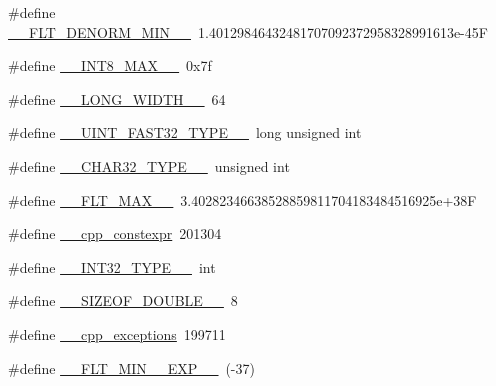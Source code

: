 \begin{DoxyCompactItemize}
\item 
\#define \hyperlink{cmake-build-debug_2babel__client__autogen_2moc__predefs_8h_a20b8951342fd8b8af91e2bc9b34eb929}{\+\_\+\+\_\+\+F\+L\+T\+\_\+\+D\+E\+N\+O\+R\+M\+\_\+\+M\+I\+N\+\_\+\+\_\+}~1.\+40129846432481707092372958328991613e-\/45F
\item 
\#define \hyperlink{cmake-build-debug_2babel__client__autogen_2moc__predefs_8h_a326c37ba86474b37dd0ae9100e005fac}{\+\_\+\+\_\+\+I\+N\+T8\+\_\+\+M\+A\+X\+\_\+\+\_\+}~0x7f
\item 
\#define \hyperlink{cmake-build-debug_2babel__client__autogen_2moc__predefs_8h_a136189a915ba49e719dcffbeba8412fd}{\+\_\+\+\_\+\+L\+O\+N\+G\+\_\+\+W\+I\+D\+T\+H\+\_\+\+\_\+}~64
\item 
\#define \hyperlink{cmake-build-debug_2babel__client__autogen_2moc__predefs_8h_a0746bdc61f4500f26c2b7408814ebfcf}{\+\_\+\+\_\+\+U\+I\+N\+T\+\_\+\+F\+A\+S\+T32\+\_\+\+T\+Y\+P\+E\+\_\+\+\_\+}~long unsigned int
\item 
\#define \hyperlink{cmake-build-debug_2babel__client__autogen_2moc__predefs_8h_acd1e46c682808f15749b16266ade0c27}{\+\_\+\+\_\+\+C\+H\+A\+R32\+\_\+\+T\+Y\+P\+E\+\_\+\+\_\+}~unsigned int
\item 
\#define \hyperlink{cmake-build-debug_2babel__client__autogen_2moc__predefs_8h_aa26975016847959a13829cb568b126b3}{\+\_\+\+\_\+\+F\+L\+T\+\_\+\+M\+A\+X\+\_\+\+\_\+}~3.\+40282346638528859811704183484516925e+38F
\item 
\#define \hyperlink{cmake-build-debug_2babel__client__autogen_2moc__predefs_8h_ae12b3591c41f3b52c31cd8b16773d5ae}{\+\_\+\+\_\+cpp\+\_\+constexpr}~201304
\item 
\#define \hyperlink{cmake-build-debug_2babel__client__autogen_2moc__predefs_8h_a72f76585ea7d1131d4e9be0110fb0ec3}{\+\_\+\+\_\+\+I\+N\+T32\+\_\+\+T\+Y\+P\+E\+\_\+\+\_\+}~int
\item 
\#define \hyperlink{cmake-build-debug_2babel__client__autogen_2moc__predefs_8h_a6a0b73b50b59fa18dbcea5b6dee0899f}{\+\_\+\+\_\+\+S\+I\+Z\+E\+O\+F\+\_\+\+D\+O\+U\+B\+L\+E\+\_\+\+\_\+}~8
\item 
\#define \hyperlink{cmake-build-debug_2babel__client__autogen_2moc__predefs_8h_a42bcb9278fa2b4721fe04fc0627055ce}{\+\_\+\+\_\+cpp\+\_\+exceptions}~199711
\item 
\#define \hyperlink{cmake-build-debug_2babel__client__autogen_2moc__predefs_8h_a442f6e00169e1726f7b9a05eb3c617d8}{\+\_\+\+\_\+\+F\+L\+T\+\_\+\+M\+I\+N\+\_\+\_\+\+E\+X\+P\+\_\+\+\_\+}~(-\/37)
\item 

\end{DoxyCompactItemize}

